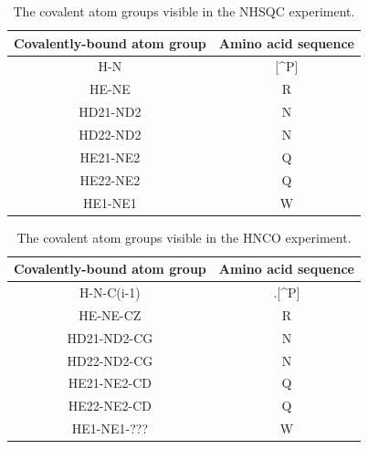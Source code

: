 \begin{table}
  \begin{tabular}{ | c | c | }
    \hline
    Covalently-bound atom group  &  Amino acid sequence  \\  \hline
    H-N                          &  [\^{}P]              \\  \hline
    HE-NE                        &  R                    \\  \hline
    HD21-ND2                     &  N                    \\  \hline
    HD22-ND2                     &  N                    \\  \hline
    HE21-NE2                     &  Q                    \\  \hline
    HE22-NE2                     &  Q                    \\  \hline
    HE1-NE1                      &  W                    \\  \hline
  \end{tabular}
  \caption{The covalent atom groups visible in the NHSQC experiment.}
  \label{nhsqc_peaktypes}
\end{table}

\begin{table}
  \begin{tabular}{ | c | c | }
    \hline
    Covalently-bound atom group  &  Amino acid sequence  \\  \hline
    H-N-C(i-1)                   &  .[\^{}P]             \\  \hline
    HE-NE-CZ                     &  R                    \\  \hline
    HD21-ND2-CG                  &  N                    \\  \hline
    HD22-ND2-CG                  &  N                    \\  \hline
    HE21-NE2-CD                  &  Q                    \\  \hline
    HE22-NE2-CD                  &  Q                    \\  \hline
    HE1-NE1-???                  &  W                    \\  \hline  %
  \end{tabular}
  \caption{The covalent atom groups visible in the HNCO experiment.}
  \label{hnco_peaktypes}
\end{table}
    
